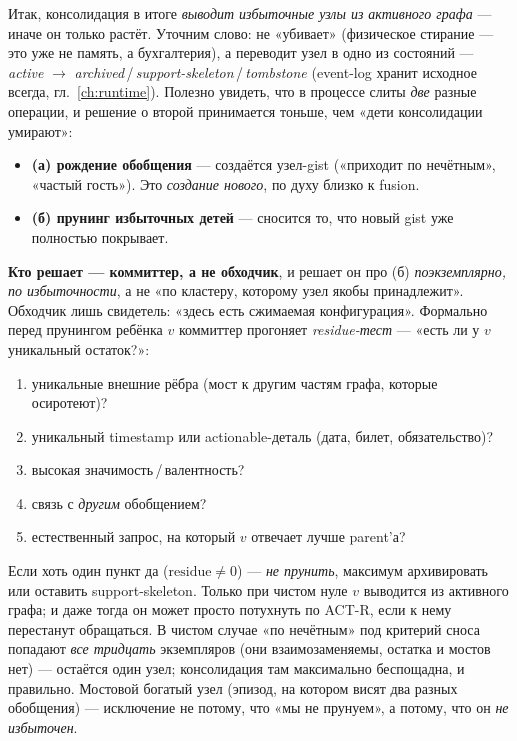 Итак, консолидация в итоге \emph{выводит избыточные узлы из активного графа} — иначе
он только растёт. Уточним слово: не «убивает» (физическое стирание — это уже не память,
а бухгалтерия), а переводит узел в одно из состояний — \emph{active} $\to$
\emph{archived}\,/\,\emph{support-skeleton}\,/\,\emph{tombstone} (event-log хранит
исходное всегда, гл.~\ref{ch:runtime}). Полезно увидеть, что в процессе слиты
\emph{две} разные операции, и решение о второй принимается тоньше, чем «дети
консолидации умирают»:
\begin{itemize}\itemsep2pt
\item \textbf{(а) рождение обобщения} — создаётся узел-gist («приходит по нечётным»,
«частый гость»). Это \emph{создание нового}, по духу близко к fusion.
\item \textbf{(б) прунинг избыточных детей} — сносится то, что новый gist уже
полностью покрывает.
\end{itemize}
\textbf{Кто решает — коммиттер, а не обходчик}, и решает он про (б) \emph{поэкземплярно,
по избыточности}, а не «по кластеру, которому узел якобы принадлежит». Обходчик лишь
свидетель: «здесь есть сжимаемая конфигурация». Формально перед прунингом ребёнка $v$
коммиттер прогоняет \emph{residue-тест} — «есть ли у $v$ уникальный остаток?»:
\begin{enumerate}\itemsep1pt
\item уникальные внешние рёбра (мост к другим частям графа, которые осиротеют)?
\item уникальный timestamp или actionable-деталь (дата, билет, обязательство)?
\item высокая значимость\,/\,валентность?
\item связь с \emph{другим} обобщением?
\item естественный запрос, на который $v$ отвечает лучше parent'а?
\end{enumerate}
Если хоть один пункт да ($\text{residue}\ne 0$) — \emph{не прунить}, максимум архивировать
или оставить support-skeleton. Только при чистом нуле $v$ выводится из активного графа;
и даже тогда он может просто потухнуть по ACT-R, если к нему перестанут обращаться. В чистом случае «по нечётным» под
критерий сноса попадают \emph{все тридцать} экземпляров (они взаимозаменяемы, остатка и
мостов нет) — остаётся один узел; консолидация там максимально беспощадна, и правильно.
Мостовой богатый узел (эпизод, на котором висят два разных обобщения) — исключение не
потому, что «мы не прунуем», а потому, что он \emph{не избыточен}.

